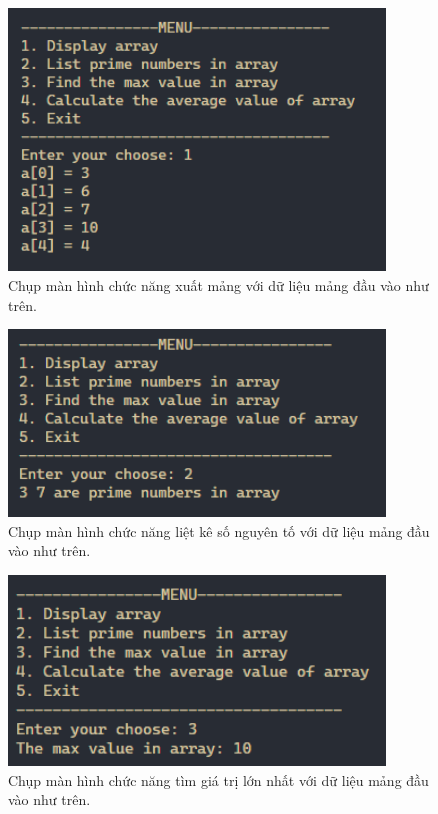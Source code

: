 \begin{figure}[H]
	\centering
	\includegraphics[width=10cm]{images/img5_1.PNG}
	\caption{Chụp màn hình chức năng xuất mảng với dữ liệu mảng đầu vào như trên.}
\end{figure}

\begin{figure}[H]
	\centering
	\includegraphics[width=10cm]{images/img5_2.PNG}
	\caption{Chụp màn hình chức năng liệt kê số nguyên tố với dữ liệu mảng đầu vào như trên.}
\end{figure}

\begin{figure}[H]
	\centering
	\includegraphics[width=10cm]{images/img5_3.PNG}
	\caption{Chụp màn hình chức năng tìm giá trị lớn nhất với dữ liệu mảng đầu vào như trên.}
\end{figure}

